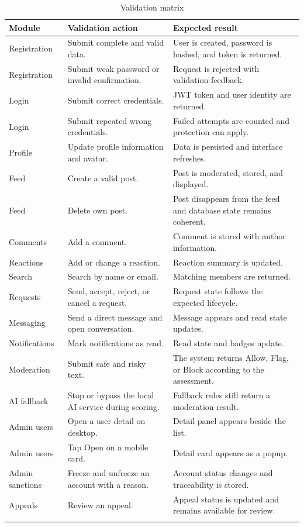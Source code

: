 \begin{longtable}{|m{3.2cm}|m{5.9cm}|m{5.3cm}|}
\hline
\textbf{Module} & \textbf{Validation action} & \textbf{Expected result} \\
\hline
Registration & Submit complete and valid data. & User is created, password is hashed, and token is returned. \\
\hline
Registration & Submit weak password or invalid confirmation. & Request is rejected with validation feedback. \\
\hline
Login & Submit correct credentials. & JWT token and user identity are returned. \\
\hline
Login & Submit repeated wrong credentials. & Failed attempts are counted and protection can apply. \\
\hline
Profile & Update profile information and avatar. & Data is persisted and interface refreshes. \\
\hline
Feed & Create a valid post. & Post is moderated, stored, and displayed. \\
\hline
Feed & Delete own post. & Post disappears from the feed and database state remains coherent. \\
\hline
Comments & Add a comment. & Comment is stored with author information. \\
\hline
Reactions & Add or change a reaction. & Reaction summary is updated. \\
\hline
Search & Search by name or email. & Matching members are returned. \\
\hline
Requests & Send, accept, reject, or cancel a request. & Request state follows the expected lifecycle. \\
\hline
Messaging & Send a direct message and open conversation. & Message appears and read state updates. \\
\hline
Notifications & Mark notifications as read. & Read state and badges update. \\
\hline
Moderation & Submit safe and risky text. & The system returns Allow, Flag, or Block according to the assessment. \\
\hline
AI fallback & Stop or bypass the local AI service during scoring. & Fallback rules still return a moderation result. \\
\hline
Admin users & Open a user detail on desktop. & Detail panel appears beside the list. \\
\hline
Admin users & Tap Open on a mobile card. & Detail card appears as a popup. \\
\hline
Admin sanctions & Freeze and unfreeze an account with a reason. & Account status changes and traceability is stored. \\
\hline
Appeals & Review an appeal. & Appeal status is updated and remains available for review. \\
\hline
\caption{Validation matrix}
\end{longtable}


